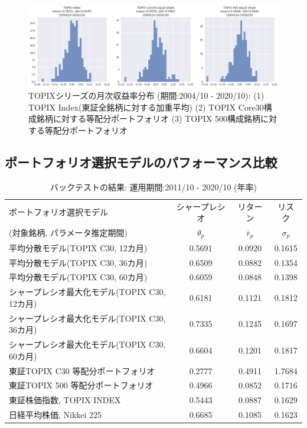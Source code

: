 \documentclass[dvipdfmx,autodetect-engine]{jsarticle}
\begin{document}
\begin{figure}[htbp]
    \begin{center}
        \includegraphics[width=0.95\hsize]{./figures/topix_ror_dist_20041031-20201031.png}
        \caption{TOPIXシリーズの月次収益率分布
        (期間:2004/10 - 2020/10): 
        (1) TOPIX Index(東証全銘柄に対する加重平均)
        (2) TOPIX Core30構成銘柄に対する等配分ポートフォリオ
        (3) TOPIX 500構成銘柄に対する等配分ポートフォリオ}
        \label{fig:two}
    \end{center}
\end{figure}

\subsection{ポートフォリオ選択モデルのパフォーマンス比較}

\begin{table}[htb]
    \caption{バックテストの結果: 運用期間:2011/10 - 2020/10 (年率)}
    \label{table:backtest_result}
    \centering
    \begin{tabular}{lccc}
        \hline
        ポートフォリオ選択モデル & シャープレシオ & リターン & リスク \\
        (対象銘柄, パラメータ推定期間) & $\theta_p$ & $\bar{r}_p$ & $\sigma_p$ \\
        \hline \hline
        平均分散モデル(TOPIX C30, 12カ月) & 0.5691 & 0.0920 & 0.1615 \\
        平均分散モデル(TOPIX C30, 36カ月) & 0.6509 & 0.0882 & 0.1354 \\
        平均分散モデル(TOPIX C30, 60カ月) & 0.6059 & 0.0848 & 0.1398 \\
        シャープレシオ最大化モデル(TOPIX C30, 12カ月) & 0.6181 & 0.1121 & 0.1812 \\
        シャープレシオ最大化モデル(TOPIX C30, 36カ月) & 0.7335 & 0.1245 & 0.1697 \\
        シャープレシオ最大化モデル(TOPIX C30, 60カ月) & 0.6604 & 0.1201 & 0.1817 \\
        東証TOPIX C30 等配分ポートフォリオ & 0.2777 & 0.4911 & 1.7684 \\ 
        東証TOPIX 500 等配分ポートフォリオ & 0.4966 & 0.0852 & 0.1716 \\ 
        東証株価指数, TOPIX INDEX & 0.5443 & 0.0887 & 0.1629 \\
        日経平均株価, Nikkei 225 & 0.6685 & 0.1085 & 0.1623 \\
        \hline
    \end{tabular}
\end{table}
\end{document}
